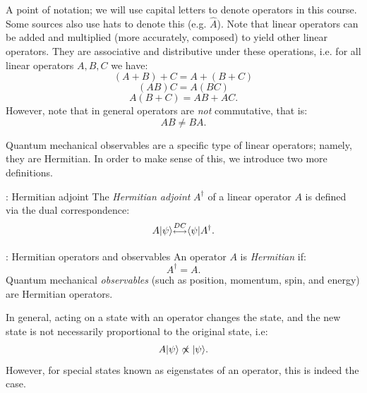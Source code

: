 A point of notation; we will use capital letters to denote operators in this course. Some sources also use hats to denote this (e.g. $\hat{A}$). Note that linear operators can be added and multiplied (more accurately, composed) to yield other linear operators. They are associative and distributive under these operations, i.e. for all linear operators $A, B, C$ we have:
\begin{equation}
    (A + B) + C = A + (B + C)
\end{equation}
\begin{equation}
    (AB)C = A(BC)
\end{equation}
\begin{equation}
    A(B + C) = AB + AC.
\end{equation}
However, note that in general operators are \emph{not} commutative, that is:
\begin{equation}
    AB \neq BA.
\end{equation}

Quantum mechanical observables are a specific type of linear operators; namely, they are Hermitian. In order to make sense of this, we introduce two more definitions.

\begin{defbox}{: Hermitian adjoint}\label{def-adjoint}
    The \emph{Hermitian adjoint} $A^\dagger$ of a linear operator $A$ is defined via the dual correspondence:
    \begin{equation}
        A\ket{\psi} \DC \bra{\psi}A^\dagger.
    \end{equation}
\end{defbox}

\begin{defbox}{: Hermitian operators and observables}\label{def-observables}
    An operator $A$ is \emph{Hermitian} if:
    \begin{equation}
        A^\dagger = A.
    \end{equation}
    Quantum mechanical \emph{observables} (such as position, momentum, spin, and energy) are Hermitian operators.
\end{defbox}

In general, acting on a state with an operator changes the state, and the new state is not necessarily proportional to the original state, i.e:
\begin{equation}
    A\lvert \psi \rangle \not\propto \lvert \psi \rangle.
\end{equation}
However, for special states known as eigenstates of an operator, this is indeed the case.

